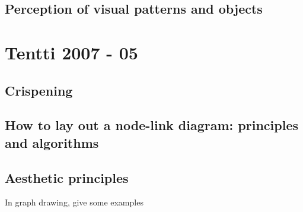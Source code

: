 \documentclass[a4paper]{article}
\begin{document}
\subsection{Perception of visual patterns and objects}

\section{Tentti 2007 - 05}

\subsection{Crispening}

\subsection{How to lay out a node-link diagram: principles and algorithms}

\subsection{Aesthetic principles}

In graph drawing, give some examples
\end{document}
